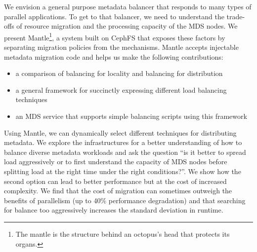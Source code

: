 We envision a general purpose metadata balancer that responds to many types of
parallel applications. To get to that balancer, we need to understand the
trade-offs of resource migration and the processing capacity of the MDS nodes.
We present Mantle\footnote{The mantle is the structure behind an octopus's head
that protects its organs.}, a system built on CephFS that exposes these factors
by separating migration policies from the mechanisms. Mantle accepts injectable
metadata migration code and helps us make the following contributions:

\begin{itemize}

    \item a comparison of balancing for locality and balancing for distribution

    \item a general framework for succinctly expressing different load
    balancing techniques 

    \item an MDS service that supports simple balancing scripts using this
    framework

\end{itemize}

Using Mantle, we can dynamically select different techniques for distributing
metadata. We explore the infrastructures for a better understanding of how to
balance diverse metadata workloads and ask the question ``is it better to
spread load aggressively or to first understand the capacity of MDS nodes
before splitting load at the right time under the right conditions?''. We show
how the second option can lead to better performance but at the cost of
increased complexity. We find that the cost of migration can sometimes outweigh
the benefits of parallelism (up to 40\% performance degradation) and that
searching for balance too aggressively increases the standard deviation in
runtime.
